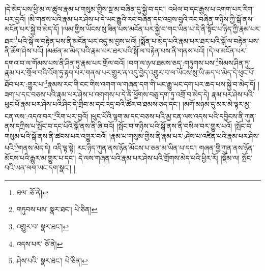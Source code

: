 །དེ་མེད་པས་ཕྱི་མ་ལ་ཚུལ་རྣམ་པ་གསུམ་གྱིས་སྔ་མ་བཞིན་དུ་སྐྱེ་བ་དང་། འཕེལ་བ་དང་རྒྱས་པ་འགག་པར་རིག་པར་བྱའོ། །མི་གནས་པའི་རྣམ་པར་ཤེས་པ་དེ་ཡང་རྒྱུའི་རང་བཞིན་དང་འབྲས་བུའི་རང་བཞིན་གཉིས་ཀྱི་སྒོ་ནས་མངོན་པར་སྐྱེ་བ་མེད་དོ། །ལམ་གྱིས་ཡོངས་སུ་ཟིན་པས་མངོན་པར་སྐྱེ་བ་གང་ཡིན་པ་དེ་ནི་སྟོང་པ་ཉིད་ཀྱི་རྣམ་པར་ཐར་\footnote{ཐལ་  ཅོ་ནེ། }པའི་སྒོ་ལ་བརྟེན་པས་ནི་མངོན་པར་འདུ་མ་བྱས་པའོ། །སྨོན་པ་མེད་པའི་རྣམ་པར་ཐར་པའི་སྒོ་ལ་བརྟེན་པས་ནི་ཆོག་ཤེས་པའོ། །མཚན་མ་མེད་པའི་རྣམ་པར་ཐར་པའི་སྒོ་ལ་བརྟེན་པས་ནི་གནས་པའོ། །དེ་ལ་མངོན་པར་དགའ་བ་ལ་གོམས་པས་ནི་ཤིན་ཏུ་རྣམ་པར་གྲོལ་བའོ། །བག་ལ་ཉལ་ཐམས་ཅད་:གཏུགས་པས་\footnote{གཏུབས་པས་  སྣར་ཐང་།  པེ་ཅིན། }སེམས་ཤིན་ཏུ་རྣམ་པར་གྲོལ་བའི་འོག་ཏུ་རྟག་པར་གནས་པར་གྱུར་ན་འདུ་བྱེད་འགྱུར་བ་ལ་ཡོངས་སུ་ཡི་ཆད་པ་མེད་དེ་ཕུང་པོ་ཐོབ་པར་:གྱུར་པ་\footnote{འགྱུར་བ་  སྣར་ཐང་། }རྣམས་རང་གི་ངང་གིས་འགག་ལ་གཞན་དག་གི་ཡང་རྒྱུ་ཡང་དག་པར་ཆད་པས་སྐྱེ་བ་མེད་དོ། །ཟག་པ་དང་བཅས་པའི་རྣམ་པར་ཤེས་པ་འགགས་པ་དེ་ནི་ཕྱོགས་བཅུ་དག་ཏུ་འགྲོ་བ་མེད་དེ། རྣམ་པར་ཤེས་པའི་ཕུང་པོ་རྣམ་པར་ཤེས་པའི་ཤིང་དེ་གྲིབ་མ་དང་འདྲ་བའི་ཚོར་བ་ཐམས་ཅད་དང་། །མགོ་མཉམ་དུ་མར་མེ་ལྟར་མྱ་ངན་ལས་:འདའ་བར་\footnote{འདས་པར་  ཅོ་ནེ། }རིག་པར་བྱའོ། །ཕུང་པོའི་ལྷག་མ་དང་བཅས་པའི་མྱ་ངན་ལས་འདས་པའི་དབྱིངས་ནི་ཀུན་ནས་དཀྲིས་པ་སྤོང་བ་དང་པོའི་སྒོ་ནས་ནི་ཞི་བའོ། །སྤོང་བ་གཉིས་པའི་སྒོ་ནས་ནི་བསིལ་བར་གྱུར་པའོ། །སྤོང་བ་གསུམ་པའི་སྒོ་ནས་ནི་ཚངས་པར་འགྱུར་བའོ། །རྣམ་པ་གསུམ་གྱིས་ནི་རྣམ་པར་:ཤེས་པ་འཛིན་པའི་རྣམ་པར་ཤེས་པའི་\footnote{ཤེས་པའི་  སྣར་ཐང་།  པེ་ཅིན། }གནས་མེད་དེ། འདི་ལྟ་སྟེ། རང་ཉིད་ཀུན་ནས་ཉོན་མོངས་པ་ཅན་མ་ཡིན་པ་དང་། གཞན་གྱི་ཀུན་ནས་ཉོན་མོངས་པའི་རྒྱུར་མ་གྱུར་པ་དང་། དེ་ལས་གཞན་པའི་རྣམ་པར་ཤེས་པའི་གྲོགས་མེད་པའི་ཕྱིར་རོ། །སྡོམ་ལ། སྤོང་བའི་ཡན་ལག་ཡང་དག་སྣང་། །
